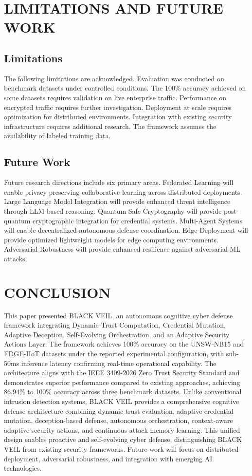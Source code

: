 \documentclass[12pt]{article}
\begin{document}
\newpage

\section{LIMITATIONS AND FUTURE WORK}

\subsection{Limitations}
The following limitations are acknowledged. Evaluation was conducted on benchmark datasets under controlled conditions. The 100\% accuracy achieved on some datasets requires validation on live enterprise traffic. Performance on encrypted traffic requires further investigation. Deployment at scale requires optimization for distributed environments. Integration with existing security infrastructure requires additional research. The framework assumes the availability of labeled training data.

\subsection{Future Work}
Future research directions include six primary areas. Federated Learning will enable privacy-preserving collaborative learning across distributed deployments. Large Language Model Integration will provide enhanced threat intelligence through LLM-based reasoning. Quantum-Safe Cryptography will provide post-quantum cryptographic integration for credential systems. Multi-Agent Systems will enable decentralized autonomous defense coordination. Edge Deployment will provide optimized lightweight models for edge computing environments. Adversarial Robustness will provide enhanced resilience against adversarial ML attacks.

\newpage

\section{CONCLUSION}

\noindent
This paper presented BLACK VEIL, an autonomous cognitive cyber defense framework integrating Dynamic Trust Computation, Credential Mutation, Adaptive Deception, Self-Evolving Orchestration, and an Adaptive Security Actions Layer. The framework achieves 100\% accuracy on the UNSW-NB15 and EDGE-IIoT datasets under the reported experimental configuration, with sub-50ms inference latency confirming real-time operational capability. The architecture aligns with the IEEE 3409-2026 Zero Trust Security Standard and demonstrates superior performance compared to existing approaches, achieving 86.94\% to 100\% accuracy across three benchmark datasets. Unlike conventional intrusion detection systems, BLACK VEIL provides a comprehensive cognitive defense architecture combining dynamic trust evaluation, adaptive credential mutation, deception-based defense, autonomous orchestration, context-aware adaptive security actions, and continuous attack memory learning. This unified design enables proactive and self-evolving cyber defense, distinguishing BLACK VEIL from existing security frameworks. Future work will focus on distributed deployment, adversarial robustness, and integration with emerging AI technologies.
\end{document}
